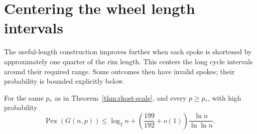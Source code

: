 \section{Centering the wheel length intervals}
\label{sec:rhost-centered-wheels}

The useful-length construction improves further when each spoke is shortened by approximately one quarter of the rim length.
This centers the long cycle intervals around their required range.
Some outcomes then have invalid spokes; their probability is bounded explicitly below.

\begin{theorem}\label{thm:rhost-centered-wheels}
For the same $p_*$ as in Theorem~\ref{thm:rhost-scale}, and every $p\ge p_*$,
with high probability
\[
 \operatorname{Pex}(G(n,p))
 \le\log_2n+\left(\frac{199}{192}+o(1)\right)\frac{\ln n}{\ln\ln n}.
\]
\end{theorem}


